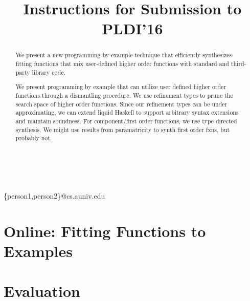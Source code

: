 \documentclass[pldi]{sigplanconf-pldi16}
\begin{document}
\title{Instructions for Submission to PLDI'16}

%
%

{ \\
  \\
}
{\{person1,person2\}@cs.auniv.edu}



\maketitle

\begin{abstract}
We present a new programming by example technique that efficiently synthesizes fitting functions that mix user-defined higher order functions with standard and third-party library code.

We present programming by example that can utilize user defined higher order functions through a dismantling procedure. We use refinement types to prune the search space of higher order functions. Since our refinement types can be under approximating, we can extend liquid Haskell to support arbitrary syntax extensions and maintain soundness. For component/first order functions, we use type directed synthesis. We might use results from paramatricity to synth first order fxns, but probably not.
\end{abstract}













\section{Online: Fitting Functions to Examples} \label{synth}


\section{Evaluation}\label{evaluation}








\end{document}
